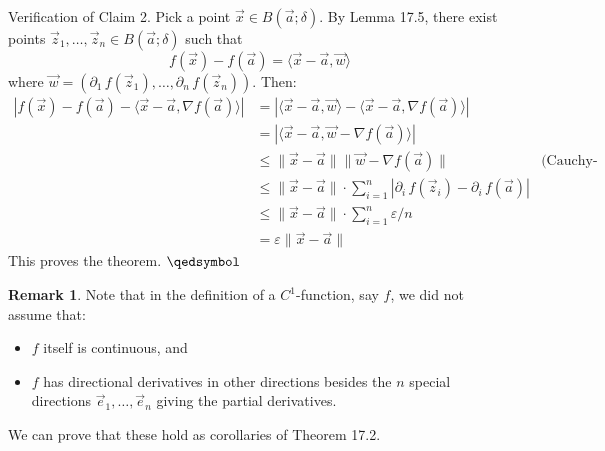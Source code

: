 \documentclass[11pt]{article}
\theoremstyle{definition}
\newtheorem{remark}[thm]{Remark}
\begin{document}
{\sc Verification of Claim 2.} Pick a point $\vec{x} \in B(\vec{a}; \delta)$. By Lemma 17.5, there exist points $\vec{z}_1, \dots, \vec{z}_n \in B(\vec{a}; \delta)$ such that
$$f(\vec{x}) - f(\vec{a}) = \langle \vec{x} - \vec{a}, \vec{w} \rangle$$
where $\vec{w} = (\partial_1\,f(\vec{z}_1), \dots, \partial_n\,f(\vec{z}_n))$. Then:
\begin{align*}
    |f(\vec{x}) - f(\vec{a}) - \langle \vec{x} - \vec{a}, \nabla f(\vec{a}) \rangle|
    &= |\langle \vec{x} - \vec{a}, \vec{w} \rangle - \langle \vec{x} - \vec{a}, \nabla f(\vec{a}) \rangle| \\
    &= |\langle \vec{x} - \vec{a}, \vec{w} - \nabla f(\vec{a}) \rangle| \\
    &\leq \|\vec{x} - \vec{a}\| \|\vec{w} - \nabla f(\vec{a})\| & \text{(Cauchy-Schwarz)} \\
    &\leq \|\vec{x} - \vec{a}\| \cdot \textstyle\sum_{i=1}^n |\partial_i\,f(\vec{z}_i) - \partial_i\,f(\vec{a})| \\
    &\leq \|\vec{x} - \vec{a}\| \cdot \textstyle\sum_{i=1}^n \varepsilon / n \\
    &= \varepsilon \|\vec{x} - \vec{a}\|
\end{align*}
This proves the theorem. \hfill $\qedsymbol$

\begin{remark}
Note that in the definition of a $C^1$-function, say $f$, we did not assume that:
\vspace{-1.5ex}\begin{itemize}
    \item $f$ itself is continuous, and
    \item $f$ has directional derivatives in other directions besides the $n$ special directions $\vec{e}_1, \dots, \vec{e}_n$ giving the partial derivatives.
\end{itemize}\vspace{-1.5ex}
We can prove that these hold as corollaries of Theorem 17.2.
\end{remark}
\end{document}
